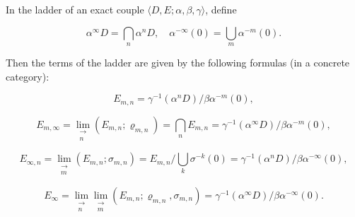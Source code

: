 In the ladder of an exact couple $\langle D, E; \alpha, \beta, \gamma \rangle$, define

$$\alpha^{\infty}D = \bigcap_{n} \alpha^{n}D, \quad \alpha^{-\infty}(0) = \bigcup_{m} \alpha^{-m}(0).$$

Then the terms of the ladder are given by the following formulas (in a concrete category):

$$E_{m,n} = \gamma^{-1}(\alpha^{n}D) / \beta\alpha^{-m}(0),$$

$$E_{m,\infty} = \lim_{\substack{\longrightarrow \\ n}} (E_{m,n}; \varrho_{m,n}) = \bigcap_{n} E_{m,n} = \gamma^{-1}(\alpha^{\infty}D) / \beta\alpha^{-m}(0),$$

$$E_{\infty,n} = \lim_{\substack{\longrightarrow \\ m}} (E_{m,n}; \sigma_{m,n}) = E_{m,n} / \bigcup_{k} \sigma^{-k}(0) = \gamma^{-1}(\alpha^{n}D) / \beta\alpha^{-\infty}(0),$$

$$E_{\infty} = \lim_{\substack{\longrightarrow \\ n}} \lim_{\substack{\longrightarrow \\ m}} (E_{m,n}; \varrho_{m,n}, \sigma_{m,n}) = \gamma^{-1}(\alpha^{\infty}D) / \beta\alpha^{-\infty}(0).$$
